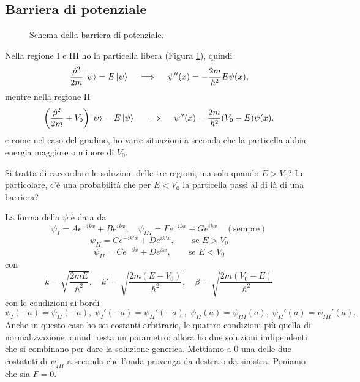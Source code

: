 \subsection{Barriera di potenziale}
\begin{figure}
\centering
{}
\caption{Schema della barriera di potenziale.}
\label{barriera}
\end{figure}
Nella regione I e III ho la particella libera (Figura \ref{barriera}), quindi
\[
\frac{\hat{p}^2}{2m}\ket{\psi} = E \ket{\psi} \quad \implies \quad \psi''(x) = -\frac{2m}{\hbar^2} E \psi(x),
\]
mentre nella regione II 
\[
\left( \frac{\hat{p}^2}{2m} + V_0 \right) \ket{\psi} = E \ket{\psi} \quad \implies \quad \psi''(x) = \frac{2m}{\hbar^2}(V_0 - E) \psi(x).
\]
e come nel caso del gradino, ho varie situazioni a seconda che la particella abbia energia maggiore o minore di \( V_0 \).

\bigskip
\noindent
Si tratta di raccordare le soluzioni delle tre regioni, ma solo quando \( E > V_0 \)? In particolare, c'è una probabilità che per \( E < V_0 \) la particella passi al di là di una barriera?

\bigskip
\noindent
La forma della \( \psi \) è data da 
\[
\psi_I = A e^{-ikx} + B e^{ikx}, \quad \psi_{III} = F e^{-ikx} + G e^{ikx} \quad (\text{sempre})
\]
\[
\psi_{II} = C e^{-ik'x} + D e^{ik'x}, \qquad \text{se } E > V_0
\]
\[
\psi_{II} = C e^{-\beta x} + D e^{\beta x}, \qquad \text{se } E < V_0
\]
con
\[
k = \sqrt{\frac{2mE}{\hbar^2}}, \quad k' = \sqrt{\frac{2m(E - V_0)}{\hbar^2}}, \quad \beta = \sqrt{\frac{2m(V_0 - E)}{\hbar^2}}
\]
con le condizioni ai bordi
\[
\psi_I(-a) = \psi_{II}(-a), \; \psi_I'(-a) = \psi_{II}'(-a), \; \psi_{II}(a) = \psi_{III}(a), \; \psi_{II}'(a) = \psi_{III}'(a).
\]
Anche in questo caso ho sei costanti arbitrarie, le quattro condizioni più quella di normalizzazione, quindi resta un parametro: allora ho due soluzioni indipendenti che si combinano per dare la soluzione generica. Mettiamo a 0 una delle due costatnti di \( \psi_{III} \) a seconda che l'onda provenga da destra o da sinistra. Poniamo che sia \( F = 0 \).

